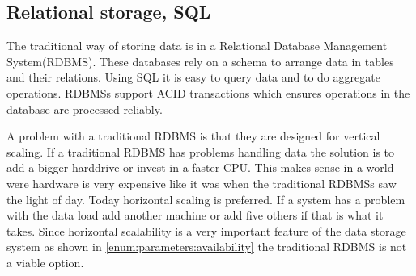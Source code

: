 \subsection{Relational storage, SQL}
\label{sec:sql}
The traditional way of storing data is in a Relational Database Management System(RDBMS).
These databases rely on a schema to arrange data in tables and their relations.
Using SQL it is easy to query data and to do aggregate operations.
RDBMSs support ACID transactions which ensures operations in the database are processed reliably.


A problem with a traditional RDBMS is that they are designed for vertical scaling\cite{Atzeni:TheRelationalModelIsDead}. If a traditional RDBMS has problems handling data the solution is to add a bigger harddrive or invest in a faster CPU. This makes sense in a world were hardware is very expensive like it was when the traditional RDBMSs saw the light of day\cite{Stonebraker:TheEndOfAnArchitecturalEra}. Today horizontal scaling is preferred. If a system has a problem with the data load add another machine or add five others if that is what it takes. Since horizontal scalability is a very important feature of the data storage system as shown in \cref{enum:parameters:availability} the traditional RDBMS is not a viable option.

